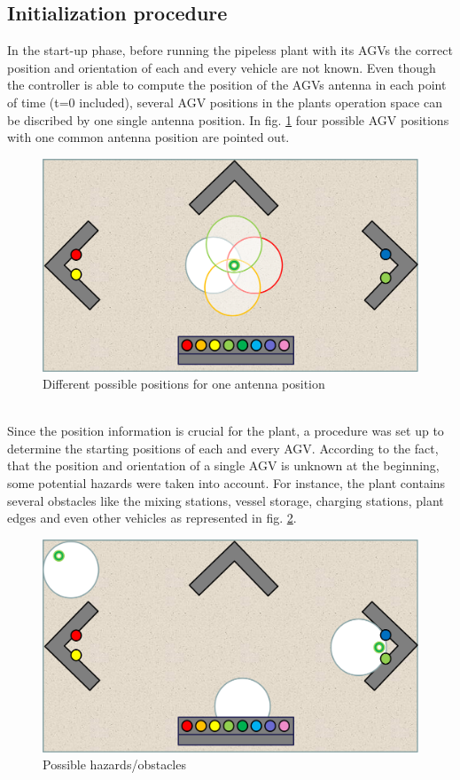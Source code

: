 \subsection{Initialization procedure}\label{Sec_Imp_Ini}
In the start-up phase, before running the pipeless plant with its AGVs the correct position and orientation of each and every vehicle are not known. Even though the controller is able to compute the position of the AGVs antenna in each point of time (t=0 included),  several AGV positions in the plants operation space can be discribed by one single antenna position. In fig. \ref{possible_initial_positions} four possible AGV positions with one common antenna position are pointed out. \\
\begin{figure}[!htbp]
\centering
\includegraphics[width = 16cm]{Pictures/possible_initial_positions}
\caption{Different possible positions for one antenna position}
\label{possible_initial_positions}
\end{figure}\\
Since the position information is crucial for the plant, a procedure was set up to determine the starting positions of each and every AGV.
According to the fact, that the position and orientation of a single AGV is unknown at the beginning, some potential hazards were taken into account. For instance, the plant contains several obstacles like the mixing stations, vessel storage, charging stations, plant edges and even other vehicles as represented in fig. \ref{hazards}.\pagebreak
\begin{figure}[!htbp]
\centering
\includegraphics[width = 16cm]{Pictures/hazards}
\caption{Possible hazards/obstacles}
\label{hazards}
\end{figure}\\
